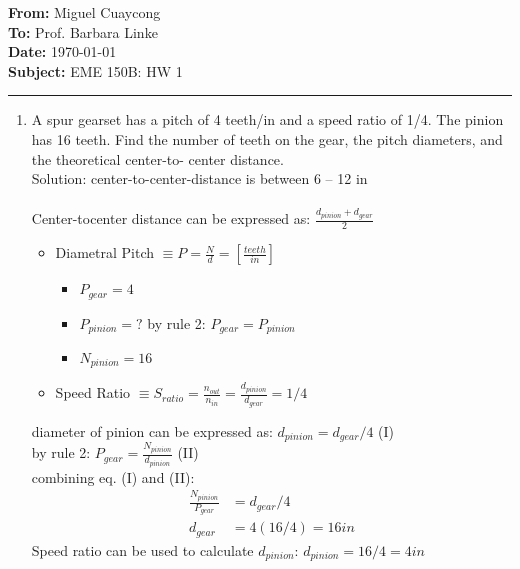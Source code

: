 \documentclass[11pt]{article}
\newcommand{\memoheader}[4]{
  \noindent
  \textbf{From:} #2\\ 
  \textbf{To:} #1\\
  \textbf{Date:} #3\\
  \textbf{Subject:} #4\\[1ex]\hrule\vspace{1.5ex}
}
\begin{document}
\memoheader{Prof. Barbara Linke}
            {Miguel Cuaycong}
            {\today}
            {EME 150B: HW 1}
\begin{enumerate}
    \item A spur gearset has a pitch of 4 teeth/in and a speed ratio of 1/4. The pinion has 16 teeth.
    Find the number of teeth on the gear, the pitch diameters, and the theoretical center-to-
    center distance.
    \\
    Solution: center-to-center-distance is between 6 – 12 in
    \\~\\
    Center-tocenter distance can be expressed as: $\frac{d_{pinion}+d_{gear}}{2}$
    \begin{itemize}
        \item Diametral Pitch $\equiv P =\frac{N}{d} =[\frac{teeth}{in}]$ 
        \begin{itemize}
            \item $P_{gear}=4$
            \item $P_{pinion}=?$ by rule 2: $P_{gear}=P_{pinion}$
            \item $N_{pinion} = 16$
        \end{itemize}
        \item Speed Ratio $\equiv S_{ratio} = \frac{n_{out}}{n_{in}} = \frac{d_{pinion}}{d_{gear}}=1/4$
    \end{itemize}
    diameter of pinion can be expressed as: $d_{pinion} = d_{gear}/4$ (I)
    \\
    by rule 2: $P_{gear}=\frac{N_{pinion}}{d_{pinion}}$ (II)
    \\
    combining eq. (I) and (II):
    \begin{align*}
        \frac{N_{pinion}}{P_{gear}}&=d_{gear}/4
        \\
        d_{gear} &= 4(16/4) = 16 in
    \end{align*}
    Speed ratio can be used to calculate $d_{pinion}$: $d_{pinion}=16/4=4in$
    \\~\\







\end{enumerate}
\end{document}
